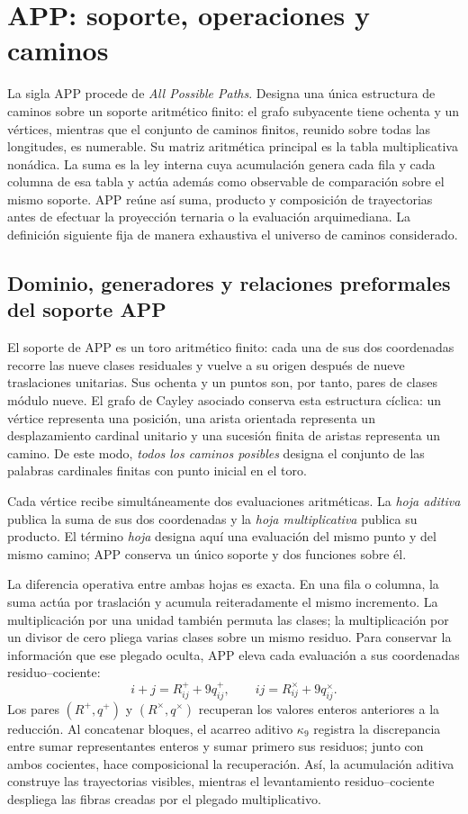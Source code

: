 \ifdefined\HMTAPPFormal
\chapter{APP: soporte, operaciones y caminos}
\label{chap:app}

\noindent
La sigla APP procede de \emph{All Possible Paths}. Designa una única
estructura de caminos sobre un soporte aritmético finito: el grafo
subyacente tiene ochenta y un vértices, mientras que el conjunto de caminos
finitos, reunido sobre todas las longitudes, es numerable. Su matriz
aritmética principal es la tabla multiplicativa nonádica. La suma es la ley
interna cuya acumulación genera cada fila y cada columna de esa tabla y actúa
además como observable de comparación sobre el mismo soporte. APP reúne así
suma, producto y
composición de trayectorias antes de efectuar la proyección ternaria o la
evaluación arquimediana. La definición siguiente fija de manera exhaustiva
el universo de caminos considerado.

\section{Dominio, generadores y relaciones preformales del soporte APP}

El soporte de APP es un toro aritmético finito: cada una de sus dos
coordenadas recorre las nueve clases residuales y vuelve a su origen después
de nueve traslaciones unitarias. Sus ochenta y un puntos son, por tanto,
pares de clases módulo nueve. El grafo de Cayley asociado conserva esta
estructura cíclica: un vértice representa una posición, una arista orientada
representa un desplazamiento cardinal unitario y una sucesión finita de
aristas representa un camino. De este modo, \emph{todos los caminos
posibles} designa el conjunto de las palabras cardinales finitas con punto
inicial en el toro.

Cada vértice recibe simultáneamente dos evaluaciones aritméticas. La
\emph{hoja aditiva} publica la suma de sus dos coordenadas y la
\emph{hoja multiplicativa} publica su producto. El término \emph{hoja}
designa aquí una evaluación del mismo punto y del mismo camino; APP conserva
un único soporte y dos funciones sobre él.

La diferencia operativa entre ambas hojas es exacta. En una fila o columna,
la suma actúa por traslación y acumula reiteradamente el mismo incremento.
La multiplicación por una unidad también permuta las clases; la
multiplicación por un divisor de cero pliega varias clases sobre un mismo
residuo. Para conservar la información que ese plegado oculta, APP eleva
cada evaluación a sus coordenadas residuo--cociente:
\[
 i+j=R^+_{ij}+9q^+_{ij},
 \qquad
 ij=R^\times_{ij}+9q^\times_{ij}.
\]
Los pares \((R^+,q^+)\) y \((R^\times,q^\times)\) recuperan los valores
enteros anteriores a la reducción. Al concatenar bloques, el acarreo aditivo
\(\kappa_9\) registra la discrepancia entre sumar representantes enteros y
sumar primero sus residuos; junto con ambos cocientes, hace composicional la
recuperación. Así, la acumulación aditiva construye las trayectorias visibles,
mientras el levantamiento residuo--cociente despliega las fibras creadas por el
plegado multiplicativo.

